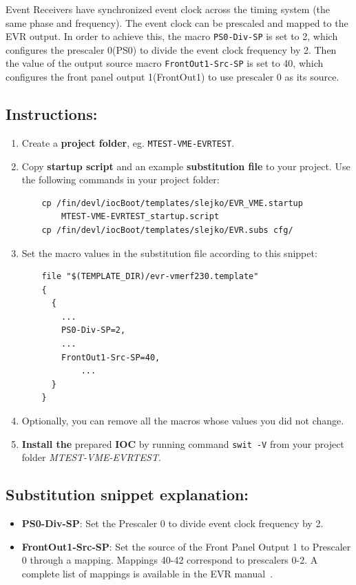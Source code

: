 \documentclass[12pt,a4paper]{article}
\begin{document}
Event Receivers have synchronized event clock across the timing system (the same phase and frequency). The event clock can be prescaled and mapped to the EVR output. In order to achieve this, the macro \texttt{PS0-Div-SP} is set to 2, which configures the prescaler 0(PS0) to divide the event clock frequency by 2. Then the value of the output source macro \texttt{FrontOut1-Src-SP} is set to 40, which configures the front panel output 1(FrontOut1) to use prescaler 0 as its source.

\subsection{Instructions:}
\begin{enumerate}
	\item Create a \textbf{project folder}, eg. \texttt{MTEST-VME-EVRTEST}.
	\item Copy \textbf{startup script} and an example \textbf{substitution file} to your project. Use the following commands in your project folder:
\begin{verbatim}
	cp /fin/devl/iocBoot/templates/slejko/EVR_VME.startup 
	    MTEST-VME-EVRTEST_startup.script
	cp /fin/devl/iocBoot/templates/slejko/EVR.subs cfg/
\end{verbatim}

	\item Set the macro values in the substitution file according to this snippet:
\begin{verbatim}
	file "$(TEMPLATE_DIR)/evr-vmerf230.template"
	{
	  {
	    ...
	    PS0-Div-SP=2,
	    ...
	    FrontOut1-Src-SP=40,
		    ...
	  }
	}
\end{verbatim}

	\item Optionally, you can remove all the macros whose values you did not change. 
	\item \textbf{Install the} prepared \textbf{IOC} by running command \texttt{swit -V} from your project folder \textit{MTEST-VME-EVRTEST}.
\end{enumerate}

\subsection{Substitution snippet explanation:}
\begin{itemize}
	\item \textbf{PS0-Div-SP}: Set the Prescaler 0 to divide event clock frequency by 2.
	\item \textbf{FrontOut1-Src-SP}: Set the source of the Front Panel Output 1  to Prescaler 0 through a mapping. Mappings 40-42 correspond to prescalers 0-2. A complete list of mappings is available in the EVR manual~\cite{evr_manual}.
\end{itemize}
\end{document}
